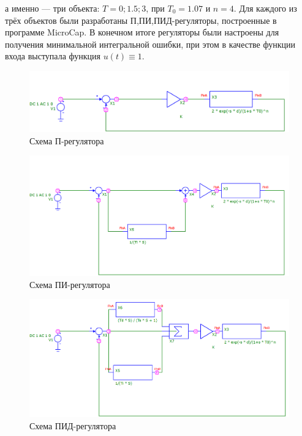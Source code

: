 а именно --- три объекта: $T = 0; 1.5; 3$, при $T_0 = 1.07$ и $n = 4$. Для каждого из трёх объектов были разработаны П,ПИ,ПИД-регуляторы, построенные в программе MicroCap. В конечном итоге регуляторы были настроены для получения минимальной интегральной ошибки, при этом в качестве функции входа выступала функция $u(t) \equiv 1$.

\begin{figure}[H]
	\centering
	\includegraphics[scale=0.4]{./screens/schemes/p_scheme.png}
	\caption{Схема П-регулятора} 
\end{figure}

\begin{figure}[H]
	\centering
	\includegraphics[scale=0.4]{./screens/schemes/pi_scheme.png}
	\caption{Схема ПИ-регулятора} 
\end{figure}

\begin{figure}[H]
	\centering
	\includegraphics[scale=0.4]{./screens/schemes/pid_scheme.png}
	\caption{Схема ПИД-регулятора} 
\end{figure}

